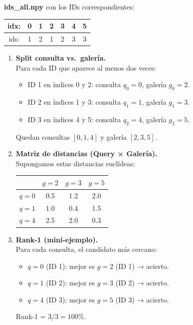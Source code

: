 \documentclass[12pt, a4paper, twoside]{article}
\begin{document}
 	\medskip
 	\noindent
 	\textbf{ids\_all.npy} con los IDs correspondientes:
 	\begin{center}
 		\begin{tabular}{c|cccccc}
 			idx: & 0 & 1 & 2 & 3 & 4 & 5 \\ \hline
 			ids: & 1 & 2 & 1 & 2 & 3 & 3
 		\end{tabular}
 	\end{center}
 	
 	\bigskip
 	
 	\begin{enumerate}
 		\item \textbf{Split consulta vs.\ galería.}\\
 		Para cada ID que aparece al menos dos veces:
 		\begin{itemize}
 			\item ID 1 en índices 0 y 2: consulta $q_0=0$, galería $g_0=2$.
 			\item ID 2 en índices 1 y 3: consulta $q_1=1$, galería $g_1=3$.
 			\item ID 3 en índices 4 y 5: consulta $q_2=4$, galería $g_2=5$.
 		\end{itemize}
 		Quedan consultas $[0,1,4]$ y galería $[2,3,5]$.
 		
 		\item \textbf{Matriz de distancias (Query × Galería).}\\
 		Supongamos estas distancias euclídeas:
 		\begin{center}
 			\begin{tabular}{c|ccc}
 				& $g=2$ & $g=3$ & $g=5$ \\ \hline
 				$q=0$ & 0.5 & 1.2 & 2.0 \\
 				$q=1$ & 1.0 & 0.4 & 1.5 \\
 				$q=4$ & 2.5 & 2.0 & 0.3
 			\end{tabular}
 		\end{center}
 		
 		\item \textbf{Rank-1 (mini-ejemplo).}\\
 		Para cada consulta, el candidato más cercano:
 		\begin{itemize}
 			\item $q=0$ (ID 1): mejor es $g=2$ (ID 1) → acierto.
 			\item $q=1$ (ID 2): mejor es $g=3$ (ID 2) → acierto.
 			\item $q=4$ (ID 3): mejor es $g=5$ (ID 3) → acierto.
 		\end{itemize}
 		Rank-1 = $3/3 = 100\%$.
 		

\end{enumerate}
\end{document}
